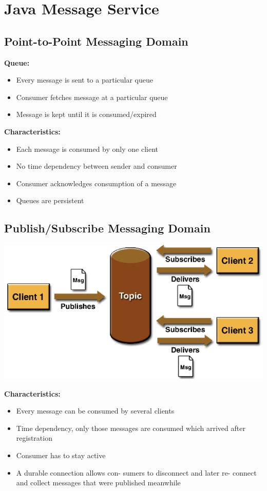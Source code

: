 \documentclass[10pt]{article}
\begin{document}
\newpage
\section{Java Message Service}
\subsection{Point-to-Point Messaging Domain}
\textbf{Queue:}
\begin{itemize}
	\item Every message is sent to a particular queue
	\item Consumer fetches message at a particular queue
	\item Message is kept until it is consumed/expired
\end{itemize}
\textbf{Characteristics:}
\begin{itemize}
	\item Each message is consumed by only one client
	\item No time dependency between sender and consumer
	\item Consumer acknowledges consumption of a message
	\item Queues are persistent
\end{itemize}
\subsection{Publish/Subscribe Messaging Domain}
\begin{center}
	\includegraphics[scale=0.25]{images/jms-messaging-domain.png}
\end{center}
\textbf{Characteristics:}
\begin{itemize}
	\item Every message can be consumed by several clients
	\item Time dependency, only those messages are consumed which arrived after registration
	\item Consumer has to stay active
	\item A durable connection allows con- sumers to disconnect and later re- connect and collect messages that were published meanwhile
\end{itemize}
\end{document}
